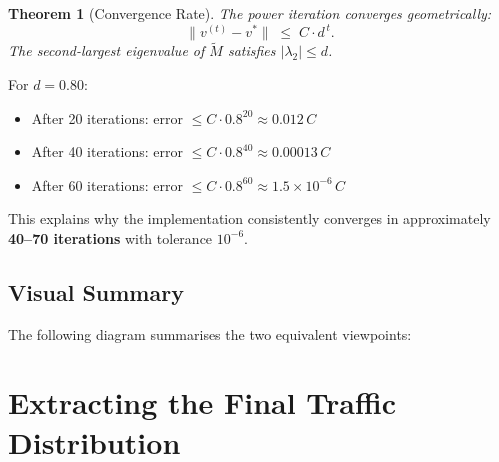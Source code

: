 \documentclass[12pt,a4paper]{article}
\theoremstyle{definition}
\theoremstyle{plain}
\newtheorem{theorem}{Theorem}[section]
\begin{document}
\begin{theorem}[Convergence Rate]
  \label{thm:conv}
  The power iteration converges geometrically:
  \[
    \|v^{(t)} - v^*\| \;\leq\; C \cdot d^{\,t}.
  \]
  The second-largest eigenvalue of $\widetilde{M}$ satisfies $|\lambda_2| \leq d$.
\end{theorem}

For $d = 0.80$:
\begin{itemize}
  \item After 20 iterations: error $\leq C \cdot 0.8^{20} \approx 0.012\,C$
  \item After 40 iterations: error $\leq C \cdot 0.8^{40} \approx 0.00013\,C$
  \item After 60 iterations: error $\leq C \cdot 0.8^{60} \approx 1.5 \times 10^{-6}\,C$
\end{itemize}
This explains why the implementation consistently converges in approximately \textbf{40--70
iterations} with tolerance $10^{-6}$.

\subsection{Visual Summary}

The following diagram summarises the two equivalent viewpoints:

\begin{center}
\end{center}

\section{Extracting the Final Traffic Distribution}
\label{sec:extract}
\end{document}
